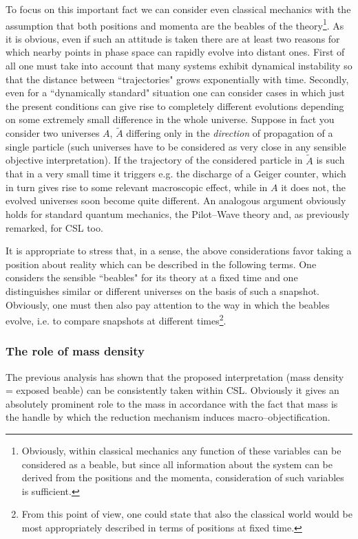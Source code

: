 \documentclass[10pt,a4paper]{article}
\begin{document}
To focus on this important fact we can consider even classical
mechanics with the assumption that both positions and momenta are
the beables of the theory\footnote{Obviously, within classical
mechanics any function of these variables can be considered as a
beable, but since all information about the system can be derived
from the positions and the momenta, consideration of such
variables is sufficient.}. As it is obvious, even if such an attitude
is taken there are at least two reasons for which nearby points in
phase space can rapidly evolve into distant ones. First of all one
must take into account that many systems exhibit dynamical
instability so that the distance between ``trajectories" grows
exponentially with time. Secondly, even for a ``dynamically
standard" situation one can consider cases in which just the
present conditions can give rise to completely different
evolutions depending on some extremely small difference in the
whole universe. Suppose in fact you consider two universes $A$,
$\tilde A$ differing only in the {\it direction} of propagation of
a single particle (such universes have to be considered as very
close in any sensible objective interpretation). If the trajectory
of the considered particle in $\tilde A$ is such that in a very
small time it triggers e.g. the discharge of a Geiger counter,
which in turn gives rise to some relevant macroscopic effect,
while in $A$ it does not, the evolved universes soon become quite
different. An analogous argument obviously holds for standard
quantum mechanics, the Pilot--Wave theory and, as previously
remarked, for CSL too.

It is appropriate to stress that, in a sense, the above
considerations favor taking a position about reality which can be
described in the following terms. One considers the sensible
``beables" for its theory at a fixed time and one distinguishes
similar or different universes on the basis of such a snapshot.
Obviously, one must then also pay attention to the way in which
the beables evolve, i.e. to compare snapshots at different
times\footnote{From this point of view, one could state that also
the classical world would be most appropriately described in terms
of positions at fixed time.}.


\subsubsection{The role of mass density} \label{sec1253}

The previous analysis has shown that the proposed interpretation
(mass density = exposed beable) can be consistently taken within
CSL. Obviously it gives an absolutely prominent role to the mass
in accordance with the fact that mass is the handle by which the
reduction mechanism induces macro--objectification.
\end{document}
